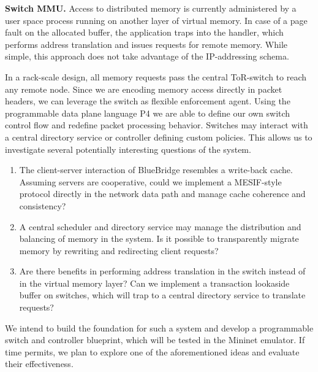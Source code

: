\textbf{Switch MMU.} Access to distributed memory is
currently administered by a user space process running on another layer of
virtual memory. In case of a page fault on the allocated buffer, the application
traps into the handler, which performs address translation and issues requests
for remote memory. While simple, this approach does not take advantage of the
IP-addressing schema.

In a rack-scale design, all memory requests pass the central ToR-switch to reach
any remote node. Since we are encoding memory access directly in packet headers,
we can leverage the switch as flexible enforcement agent. Using the programmable
data plane language P4 we are able to define our own switch control flow and
redefine packet processing behavior. Switches may interact with a central
directory service or controller defining custom policies. This allows us to
investigate several potentially interesting questions of the system.
\begin{enumerate}
\item The client-server interaction of BlueBridge resembles a write-back cache.
Assuming servers are cooperative, could we implement a MESIF-style protocol
directly in the network data path and manage cache coherence and consistency?
\item A central scheduler and directory service may manage the distribution and
balancing of memory in the system. Is it possible to transparently migrate
memory by rewriting and redirecting client requests?
\item Are there benefits in performing address translation in the switch instead
of in the virtual memory layer? Can we implement a transaction lookaside buffer
on switches, which will trap to a central directory service to translate requests?

\end{enumerate}
We intend to build the foundation for such a system and develop a programmable
switch and controller blueprint, which will be tested in the Mininet emulator.
If time permits, we plan to explore one of the aforementioned ideas and evaluate
their effectiveness.
